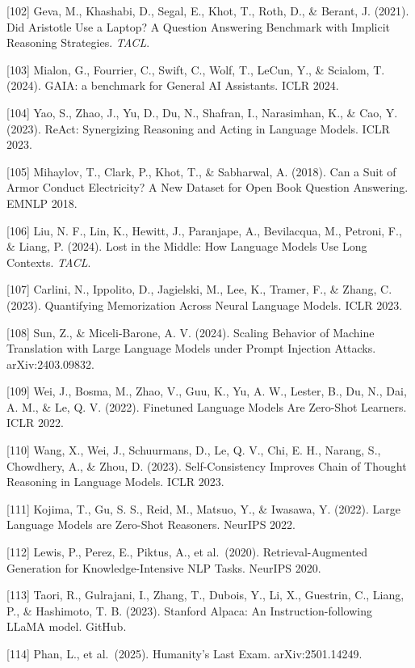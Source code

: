 {[}102{]} Geva, M., Khashabi, D., Segal, E., Khot, T., Roth, D., \& Berant, J. (2021). Did Aristotle Use a Laptop? A Question Answering Benchmark with Implicit Reasoning Strategies. \emph{TACL}.

{[}103{]} Mialon, G., Fourrier, C., Swift, C., Wolf, T., LeCun, Y., \& Scialom, T. (2024). GAIA: a benchmark for General AI Assistants. ICLR 2024.

{[}104{]} Yao, S., Zhao, J., Yu, D., Du, N., Shafran, I., Narasimhan, K., \& Cao, Y. (2023). ReAct: Synergizing Reasoning and Acting in Language Models. ICLR 2023.

{[}105{]} Mihaylov, T., Clark, P., Khot, T., \& Sabharwal, A. (2018). Can a Suit of Armor Conduct Electricity? A New Dataset for Open Book Question Answering. EMNLP 2018.

{[}106{]} Liu, N. F., Lin, K., Hewitt, J., Paranjape, A., Bevilacqua, M., Petroni, F., \& Liang, P. (2024). Lost in the Middle: How Language Models Use Long Contexts. \emph{TACL}.

{[}107{]} Carlini, N., Ippolito, D., Jagielski, M., Lee, K., Tramer, F., \& Zhang, C. (2023). Quantifying Memorization Across Neural Language Models. ICLR 2023.

{[}108{]} Sun, Z., \& Miceli-Barone, A. V. (2024). Scaling Behavior of Machine Translation with Large Language Models under Prompt Injection Attacks. arXiv:2403.09832.

{[}109{]} Wei, J., Bosma, M., Zhao, V., Guu, K., Yu, A. W., Lester, B., Du, N., Dai, A. M., \& Le, Q. V. (2022). Finetuned Language Models Are Zero-Shot Learners. ICLR 2022.

{[}110{]} Wang, X., Wei, J., Schuurmans, D., Le, Q. V., Chi, E. H., Narang, S., Chowdhery, A., \& Zhou, D. (2023). Self-Consistency Improves Chain of Thought Reasoning in Language Models. ICLR 2023.

{[}111{]} Kojima, T., Gu, S. S., Reid, M., Matsuo, Y., \& Iwasawa, Y. (2022). Large Language Models are Zero-Shot Reasoners. NeurIPS 2022.

{[}112{]} Lewis, P., Perez, E., Piktus, A., et al.~(2020). Retrieval-Augmented Generation for Knowledge-Intensive NLP Tasks. NeurIPS 2020.

{[}113{]} Taori, R., Gulrajani, I., Zhang, T., Dubois, Y., Li, X., Guestrin, C., Liang, P., \& Hashimoto, T. B. (2023). Stanford Alpaca: An Instruction-following LLaMA model. GitHub.

{[}114{]} Phan, L., et al.~(2025). Humanity's Last Exam. arXiv:2501.14249.

